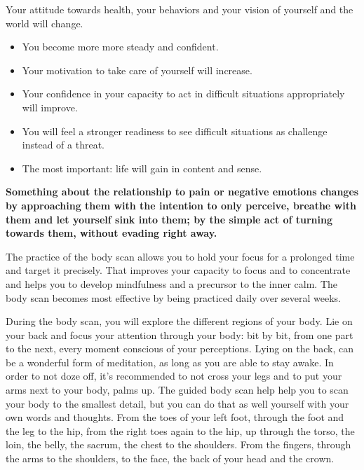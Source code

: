 \documentclass[../main.tex]{subfiles}
\begin{document}
\label{Ex:BodyScan}

Your attitude towards health,  your behaviors and your vision of yourself and the world will change.

\begin{itemize}
\item You become more more {steady and confident}.
\item Your motivation to {take care of yourself} will increase.
\item Your confidence in your capacity to {act in difficult situations appropriately} will improve.
\item You will feel a stronger readiness to {see difficult situations as challenge} instead of a threat.
\item The most important: {life will gain in content and sense}.
\end{itemize} 

\textbf{Something about the {relationship to pain or negative emotions changes} by approaching them with the intention to {only perceive}, {breathe} with them and let yourself {sink into them};
  by the simple act of {turning towards them}, without evading right away.}

The practice of the body scan allows you to hold your {focus for a prolonged time} and target it precisely.
That improves your {capacity to focus} and to concentrate and helps you to develop mindfulness and a precursor to the {inner calm}.
The body scan becomes most effective by being practiced {daily over several weeks}.

During the body scan, you will {explore the different regions of your body}.
{Lie on your back} and focus your attention through your body: bit by bit, from one part to the next, every moment {conscious of your perceptions}.
{Lying on the back}, can be a wonderful form of meditation, as long as you are able to {stay awake}.
In order to not doze off, it's recommended to {not cross your legs} and to put your {arms next to your body, palms up}.
The guided body scan help help you to scan your body to the smallest detail, but you can do that as well yourself with {your own words and thoughts}. 
{From the toes of your left foot, through the foot and the leg to the hip, from the right toes again to the hip, up through the torso, the loin, the belly, the sacrum, the chest to the shoulders.
  From the fingers, through the arms to the shoulders, to the face, the back of your head and the crown}.
\end{document}
